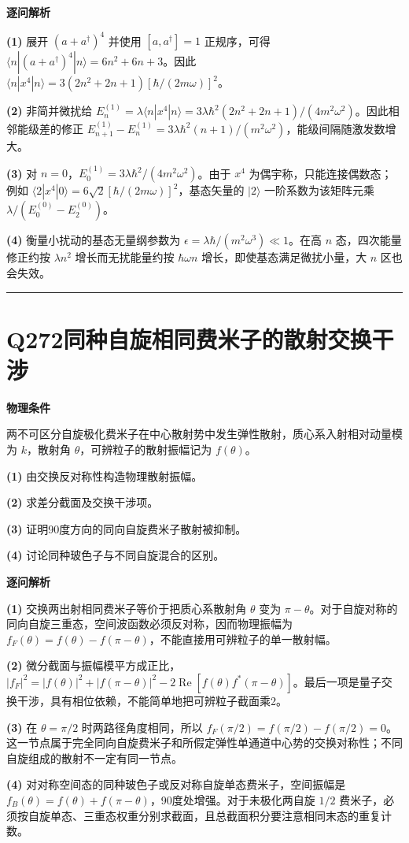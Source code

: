 \documentclass[UTF8,a4paper,11pt,oneside,openany]{ctexbook}
\begin{document}
\par\medskip\noindent\textbf{逐问解析}
\par\noindent\textbf{(1)} 展开 \((a+a^\dagger)^4\) 并使用 \([a,a^\dagger]=1\) 正规序，可得 \(\langle n|(a+a^\dagger)^4|n\rangle=6n^2+6n+3\)。因此 \(\langle n|x^4|n\rangle=3(2n^2+2n+1)[\hbar/(2m\omega)]^2\)。
\par\noindent\textbf{(2)} 非简并微扰给 \(E_n^{(1)}=\lambda\langle n|x^4|n\rangle=3\lambda\hbar^2(2n^2+2n+1)/(4m^2\omega^2)\)。因此相邻能级差的修正 \(E_{n+1}^{(1)}-E_n^{(1)}=3\lambda\hbar^2(n+1)/(m^2\omega^2)\)，能级间隔随激发数增大。
\par\noindent\textbf{(3)} 对 \(n=0\)，\(E_0^{(1)}=3\lambda\hbar^2/(4m^2\omega^2)\)。由于 \(x^4\) 为偶宇称，只能连接偶数态；例如 \(\langle2|x^4|0\rangle=6\sqrt2[\hbar/(2m\omega)]^2\)，基态矢量的 \(|2\rangle\) 一阶系数为该矩阵元乘 \(\lambda/(E_0^{(0)}-E_2^{(0)})\)。
\par\noindent\textbf{(4)} 衡量小扰动的基态无量纲参数为 \(\epsilon=\lambda\hbar/(m^2\omega^3)\ll1\)。在高 \(n\) 态，四次能量修正约按 \(\lambda n^2\) 增长而无扰能量约按 \(\hbar\omega n\) 增长，即使基态满足微扰小量，大 \(n\) 区也会失效。

\par\bigskip\hrule\bigskip
\section*{Q272\quad 同种自旋相同费米子的散射交换干涉}
\textbf{物理条件}\par 两不可区分自旋极化费米子在中心散射势中发生弹性散射，质心系入射相对动量模为 \(k\)，散射角 \(\theta\)，可辨粒子的散射振幅记为 \(f(\theta)\)。
\par\noindent\textbf{(1)} 由交换反对称性构造物理散射振幅。
\par\noindent\textbf{(2)} 求差分截面及交换干涉项。
\par\noindent\textbf{(3)} 证明90度方向的同向自旋费米子散射被抑制。
\par\noindent\textbf{(4)} 讨论同种玻色子与不同自旋混合的区别。

\par\medskip\noindent\textbf{逐问解析}
\par\noindent\textbf{(1)} 交换两出射相同费米子等价于把质心系散射角 \(\theta\) 变为 \(\pi-\theta\)。对于自旋对称的同向自旋三重态，空间波函数必须反对称，因而物理振幅为 \(f_F(\theta)=f(\theta)-f(\pi-\theta)\)，不能直接用可辨粒子的单一散射幅。
\par\noindent\textbf{(2)} 微分截面与振幅模平方成正比，\(|f_F|^2=|f(\theta)|^2+|f(\pi-\theta)|^2-2\operatorname{Re}[f(\theta)f^*(\pi-\theta)]\)。最后一项是量子交换干涉，具有相位依赖，不能简单地把可辨粒子截面乘2。
\par\noindent\textbf{(3)} 在 \(\theta=\pi/2\) 时两路径角度相同，所以 \(f_F(\pi/2)=f(\pi/2)-f(\pi/2)=0\)。这一节点属于完全同向自旋费米子和所假定弹性单通道中心势的交换对称性；不同自旋组成的散射不一定有同一节点。
\par\noindent\textbf{(4)} 对对称空间态的同种玻色子或反对称自旋单态费米子，空间振幅是 \(f_B(\theta)=f(\theta)+f(\pi-\theta)\)，90度处增强。对于未极化两自旋 \(1/2\) 费米子，必须按自旋单态、三重态权重分别求截面，且总截面积分要注意相同末态的重复计数。
\end{document}
